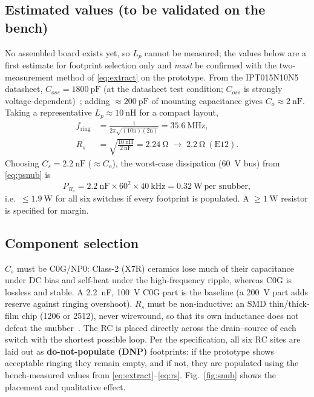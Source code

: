 \documentclass[journal,onecolumn,11pt]{IEEEtran}
\begin{document}
\subsection{Estimated values (to be validated on the bench)}
No assembled board exists yet, so $L_p$ cannot be measured; the values below are a first estimate for
footprint selection only and \emph{must} be confirmed with the two-measurement method of
\eqref{eq:extract} on the prototype. From the IPT015N10N5 datasheet, $C_{oss}=\SI{1800}{\pico\farad}$
(at the datasheet test condition; $C_{oss}$ is strongly voltage-dependent)~\cite{ipt015ds,ipt015part};
adding $\approx\SI{200}{\pico\farad}$ of mounting capacitance gives $C_o\approx\SI{2}{\nano\farad}$.
Taking a representative $L_p\approx\SI{10}{\nano\henry}$ for a compact layout,
\begin{align}
f_{\mathrm{ring}}&=\frac{1}{2\pi\sqrt{(10\text{n})(2\text{n})}}=\SI{35.6}{\mega\hertz},\\
R_s&=\sqrt{\frac{\SI{10}{\nano\henry}}{\SI{2}{\nano\farad}}}=\SI{2.24}{\ohm}\;\to\;\SI{2.2}{\ohm}\ (\text{E12}).
\end{align}
Choosing $C_s=\SI{2.2}{\nano\farad}$ ($\approx C_o$), the worst-case dissipation (\SI{60}{\volt} bus)
from \eqref{eq:psnub} is
\begin{equation}
P_{R_s}=\SI{2.2}{\nano\farad}\times 60^{2}\times\SI{40}{\kilo\hertz}=\SI{0.32}{\watt}\ \text{per snubber},
\end{equation}
i.e.\ $\le\SI{1.9}{\watt}$ for all six switches if every footprint is populated. A
$\ge\SI{1}{\watt}$ resistor is specified for margin.

\subsection{Component selection}
$C_s$ must be C0G/NP0: Class-2 (X7R) ceramics lose much of their capacitance under DC bias and
self-heat under the high-frequency ripple, whereas C0G is lossless and stable. A
\SI{2.2}{\nano\farad}, \SI{100}{\volt} C0G part is the baseline (a \SI{200}{\volt} part adds reserve
against ringing overshoot). $R_s$ must be non-inductive: an SMD thin/thick-film chip (1206 or 2512),
never wirewound, so that its own inductance does not defeat the snubber~\cite{severns}. The RC is
placed directly across the drain--source of each switch with the shortest possible loop. Per the
specification, all six RC sites are laid out as \textbf{do-not-populate (DNP)} footprints: if the
prototype shows acceptable ringing they remain empty, and if not, they are populated using the
bench-measured values from \eqref{eq:extract}--\eqref{eq:rs}. Fig.~\ref{fig:snub} shows the placement
and qualitative effect.
\end{document}
